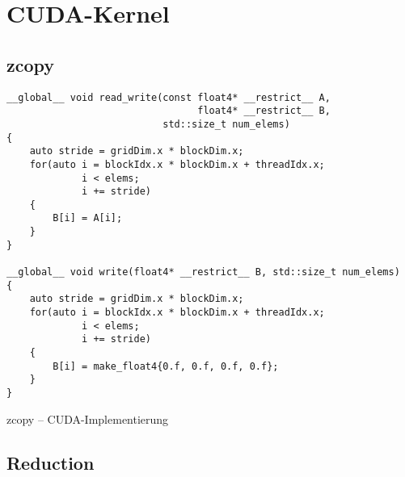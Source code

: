 \appendix

\section{CUDA-Kernel}

\subsection{zcopy}

\begin{code}
    \begin{verbatim}
__global__ void read_write(const float4* __restrict__ A,
                                 float4* __restrict__ B,
                           std::size_t num_elems)
{
    auto stride = gridDim.x * blockDim.x;
    for(auto i = blockIdx.x * blockDim.x + threadIdx.x;
             i < elems;
             i += stride)
    {
        B[i] = A[i];
    }
}

__global__ void write(float4* __restrict__ B, std::size_t num_elems)
{
    auto stride = gridDim.x * blockDim.x;
    for(auto i = blockIdx.x * blockDim.x + threadIdx.x;
             i < elems;
             i += stride)
    {
        B[i] = make_float4{0.f, 0.f, 0.f, 0.f};
    }
}
    \end{verbatim}
    \caption{zcopy -- CUDA-Implementierung}
    \label{anhang:cuda:zcopy}
\end{code}

\subsection{Reduction}

